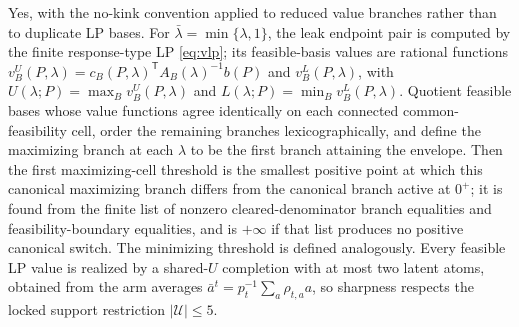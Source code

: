 \begin{theorem}\label{thm:vertex}
Yes, with the no-kink convention applied to reduced value branches rather than to duplicate LP bases. For $\bar\lambda=\min\{\lambda,1\}$, the leak endpoint pair is computed by the finite response-type LP \eqref{eq:vlp}; its feasible-basis values are rational functions $v_B^U(P,\lambda)=c_B(P,\lambda)^\mathsf{T}A_B(\lambda)^{-1}b(P)$ and $v_B^L(P,\lambda)$, with $U(\lambda;P)=\max_B v_B^U(P,\lambda)$ and $L(\lambda;P)=\min_B v_B^L(P,\lambda)$. Quotient feasible bases whose value functions agree identically on each connected common-feasibility cell, order the remaining branches lexicographically, and define the maximizing branch at each $\lambda$ to be the first branch attaining the envelope. Then the first maximizing-cell threshold is the smallest positive point at which this canonical maximizing branch differs from the canonical branch active at $0^+$; it is found from the finite list of nonzero cleared-denominator branch equalities and feasibility-boundary equalities, and is $+\infty$ if that list produces no positive canonical switch. The minimizing threshold is defined analogously. Every feasible LP value is realized by a shared-$U$ completion with at most two latent atoms, obtained from the arm averages $\bar a^t=p_t^{-1}\sum_a\rho_{t,a}a$, so sharpness respects the locked support restriction $|\mathcal U|\le5$.


\end{theorem}
